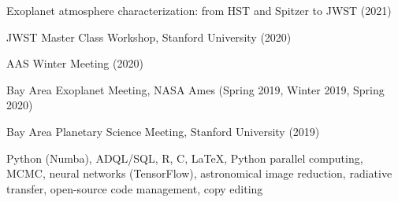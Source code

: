 \documentclass[12pt,letterpaper]{article}
\begin{document}
\begin{list}{}{\cvlist}
\item Exoplanet atmosphere characterization: from HST and Spitzer to JWST (2021)
\item JWST Master Class Workshop, Stanford University (2020)
\item AAS Winter Meeting (2020)
\item Bay Area Exoplanet Meeting, NASA Ames (Spring 2019, Winter 2019, Spring 2020)
\item Bay Area Planetary Science Meeting, Stanford University (2019)
\end{list}

\begin{list}{}{\cvlist}
\item Python (Numba), ADQL/SQL, R, C, \LaTeX, Python parallel computing, MCMC, neural networks (TensorFlow), astronomical image reduction, radiative transfer, open-source code management, copy editing
\end{list}
\end{document}

